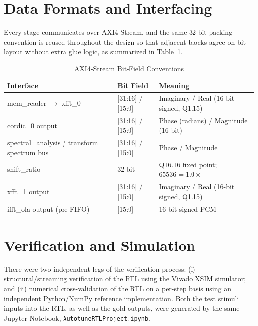 \documentclass[conference,a4paper]{IEEEtran}
\begin{document}
\section{Data Formats and Interfacing}
\label{sec:dataformats}
Every stage communicates over AXI4-Stream, and the same 32-bit packing convention is reused
throughout the design so that adjacent blocks agree on bit layout without extra glue logic,
as summarized in Table~\ref{tab:dataformats}.

\begin{table}[!t]
\centering
\caption{AXI4-Stream Bit-Field Conventions}
\label{tab:dataformats}
\begin{tabular}{p{5.5cm}p{2.8cm}p{7.8cm}}
\toprule
\textbf{Interface} & \textbf{Bit Field} & \textbf{Meaning} \\
\midrule
mem\_reader $\to$ xfft\_0 & [31:16] / [15:0] & Imaginary / Real (16-bit signed, Q1.15) \\
cordic\_0 output & [31:16] / [15:0] & Phase (radians) / Magnitude (16-bit) \\
spectral\_analysis / transform spectrum bus & [31:16] / [15:0] & Phase / Magnitude \\
shift\_ratio & 32-bit & Q16.16 fixed point; $65536 = 1.0\times$ \\
xfft\_1 output & [31:16] / [15:0] & Imaginary / Real (16-bit signed, Q1.15) \\
ifft\_ola output (pre-FIFO) & [15:0] & 16-bit signed PCM \\
\bottomrule
\end{tabular}
\end{table}

\section{Verification and Simulation}
\label{sec:verif}
There were two independent legs of the verification process: (i) structural/streaming verification of the RTL using the Vivado XSIM simulator; and (ii) numerical cross-validation of the RTL on a per-step basis using an independent Python/NumPy reference implementation. Both the test stimuli inputs into the RTL, as well as the gold outputs, were generated by the same Jupyter Notebook,
\texttt{AutotuneRTLProject.ipynb}.
\end{document}
